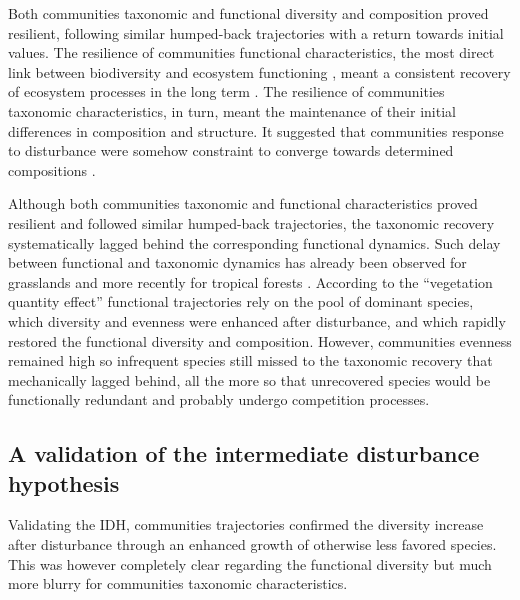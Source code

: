 \documentclass[fleqn,10pt]{ArtEcoFoG} %
\theoremstyle{definition}
\theoremstyle{definition}
\theoremstyle{definition}
\theoremstyle{remark}
\begin{document}
Both communities taxonomic and functional diversity and composition
proved resilient, following similar humped-back trajectories with a
return towards initial values. The resilience of communities functional
characteristics, the most direct link between biodiversity and ecosystem
functioning \citep{Diaz2005}, meant a consistent recovery of ecosystem
processes in the long term \citep{Guariguata2001}. The resilience of
communities taxonomic characteristics, in turn, meant the maintenance of
their initial differences in composition and structure. It suggested
that communities response to disturbance were somehow constraint to
converge towards determined compositions
\citep{Hubbell1999, Molino2001, Anderson2007, Baraloto2012a}.

Although both communities taxonomic and functional characteristics
proved resilient and followed similar humped-back trajectories, the
taxonomic recovery systematically lagged behind the corresponding
functional dynamics. Such delay between functional and taxonomic
dynamics has already been observed for grasslands
\citep{Tilman1997, Mouillot2011} and more recently for tropical forests
\citep{Lohbeck2015, Guariguata2001}. According to the ``vegetation
quantity effect'' \citep{Grime1998} functional trajectories rely on the
pool of dominant species, which diversity and evenness were enhanced
after disturbance, and which rapidly restored the functional diversity
and composition. However, communities evenness remained high so
infrequent species still missed to the taxonomic recovery that
mechanically lagged behind, all the more so that unrecovered species
would be functionally redundant and probably undergo competition
processes.

\subsection{A validation of the intermediate disturbance
hypothesis}\label{a-validation-of-the-intermediate-disturbance-hypothesis}

Validating the IDH, communities trajectories confirmed the diversity
increase after disturbance through an enhanced growth of otherwise less
favored species. This was however completely clear regarding the
functional diversity but much more blurry for communities taxonomic
characteristics.
\end{document}
